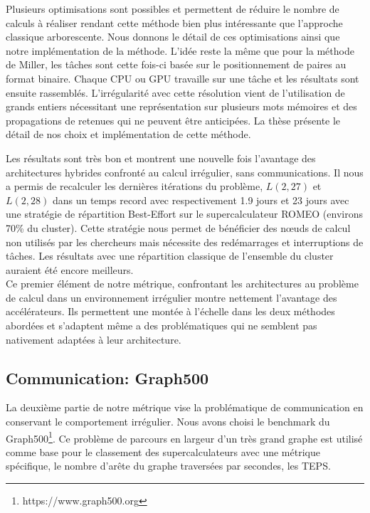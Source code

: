 \documentclass[12pt,a4paper]{report}
\begin{document}
Plusieurs optimisations sont possibles et permettent de réduire le nombre de calculs à réaliser rendant cette méthode bien plus intéressante que l'approche classique arborescente. 
Nous donnons le détail de ces optimisations ainsi que notre implémentation de la méthode. 
L'idée reste la même que pour la méthode de Miller, les tâches sont cette fois-ci basée sur le positionnement de paires au format binaire.
Chaque CPU ou GPU travaille sur une tâche et les résultats sont ensuite rassemblés. 
L'irrégularité avec cette résolution vient de l'utilisation de grands entiers nécessitant une représentation sur plusieurs mots mémoires et des propagations de retenues qui ne peuvent être anticipées. 
La thèse présente le détail de nos choix et implémentation de cette méthode. 

Les résultats sont très bon et montrent une nouvelle fois l'avantage des architectures hybrides confronté au calcul irrégulier, sans communications. 
Il nous a permis de recalculer les dernières itérations du problème, $L(2,27)$ et $L(2,28)$ dans un temps record avec respectivement 1.9 jours et 23 jours avec une stratégie de répartition Best-Effort sur le supercalculateur ROMEO (environs 70\% du cluster). 
Cette stratégie nous permet de bénéficier des nœuds de calcul non utilisés par les chercheurs mais nécessite des redémarrages et interruptions de tâches. 
Les résultats avec une répartition classique de l'ensemble du cluster auraient été encore meilleurs.\\ 

Ce premier élément de notre métrique, confrontant les architectures au problème de calcul dans un environnement irrégulier montre nettement l'avantage des accélérateurs. 
Ils permettent une montée à l'échelle dans les deux méthodes abordées et s'adaptent même a des problématiques qui ne semblent pas nativement adaptées à leur architecture. 

\subsection{Communication: Graph500}
La deuxième partie de notre métrique vise la problématique de communication en conservant le comportement irrégulier. 
Nous avons choisi le benchmark du Graph500\footnote{https://www.graph500.org}. 
Ce problème de parcours en largeur d'un très grand graphe est utilisé comme base pour le classement des supercalculateurs avec une métrique spécifique, le nombre d'arête du graphe traversées par secondes, les TEPS. 
\end{document}
